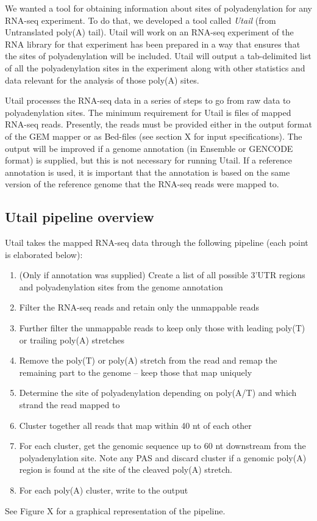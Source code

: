 %

We wanted a tool for obtaining information about sites of polyadenylation for
any RNA-seq experiment. To do that, we developed a tool called \textit{Utail}
(from Untranslated poly(A) tail). Utail will work on an RNA-seq experiment of
the RNA library for that experiment has been prepared in a way that ensures
that the sites of polyadenylation will be included. Utail will output a
tab-delimited list of all the polyadenylation sites in the experiment along
with other statistics and data relevant for the analysis of those poly(A)
sites.

Utail processes the RNA-seq data in a series of steps to go from raw data to
polyadenylation sites. The minimum requirement for Utail is files of mapped
RNA-seq reads. Presently, the reads must be provided either in the output
format of the GEM mapper \cite{ribeca_gem_2010} or as Bed-files (see section X
for input specifications). The output will be improved if a genome annotation
(in Ensemble or GENCODE format) is supplied, but this is not necessary for
running Utail. If a reference annotation is used, it is important that the
annotation is based on the same version of the reference genome that the
RNA-seq reads were mapped to.

\subsection{Utail pipeline overview}

Utail takes the mapped RNA-seq data through the following pipeline (each point
is elaborated below):
\begin{enumerate}
	\item (Only if annotation was supplied) Create a list of all possible
		3'UTR regions and polyadenylation sites from the genome annotation
	\item Filter the RNA-seq reads and retain only the unmappable reads
	\item Further filter the unmappable reads to keep only those with leading
		poly(T) or trailing poly(A) stretches
	\item Remove the poly(T) or poly(A) stretch from the read and remap the
		remaining part to the genome -- keep those that map uniquely
	\item Determine the site of polyadenylation depending on poly(A/T) and which
		strand the read mapped to
	\item Cluster together all reads that map within 40 nt of each other
	\item For each cluster, get the genomic sequence up to 60 nt downstream
		from the polyadenylation site. Note any PAS and discard cluster if a
		genomic poly(A) region is found at the site of the cleaved poly(A)
		stretch.
	\item For each poly(A) cluster, write to the output
\end{enumerate}
See Figure X for a graphical representation of the pipeline.

